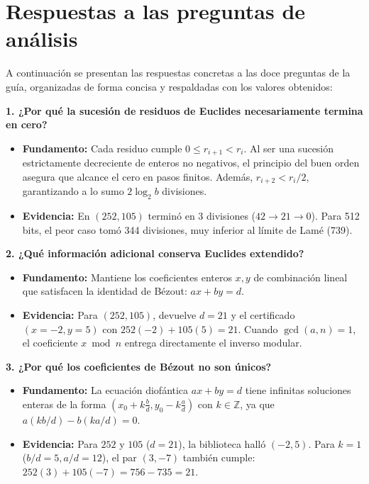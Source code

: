 \section{Respuestas a las preguntas de análisis}

A continuación se presentan las respuestas concretas a las doce preguntas de la guía, organizadas de forma concisa y respaldadas con los valores obtenidos:

\smallskip
\noindent\textbf{1. ¿Por qué la sucesión de residuos de Euclides necesariamente termina en cero?}
\begin{itemize}\setlength\itemsep{0pt}\setlength\parskip{0pt}
    \item \textbf{Fundamento:} Cada residuo cumple $0 \le r_{i+1} < r_i$. Al ser una sucesión estrictamente decreciente de enteros no negativos, el principio del buen orden asegura que alcance el cero en pasos finitos. Además, $r_{i+2} < r_i / 2$, garantizando a lo sumo $2 \log_2 b$ divisiones.
    \item \textbf{Evidencia:} En $(252, 105)$ terminó en 3 divisiones ($42 \to 21 \to 0$). Para 512 bits, el peor caso tomó 344 divisiones, muy inferior al límite de Lamé (739).
\end{itemize}

\smallskip
\noindent\textbf{2. ¿Qué información adicional conserva Euclides extendido?}
\begin{itemize}\setlength\itemsep{0pt}\setlength\parskip{0pt}
    \item \textbf{Fundamento:} Mantiene los coeficientes enteros $x, y$ de combinación lineal que satisfacen la identidad de Bézout: $ax + by = d$.
    \item \textbf{Evidencia:} Para $(252, 105)$, devuelve $d = 21$ y el certificado $(x = -2, y = 5)$ con $252(-2) + 105(5) = 21$. Cuando $\gcd(a, n) = 1$, el coeficiente $x \bmod n$ entrega directamente el inverso modular.
\end{itemize}

\smallskip
\noindent\textbf{3. ¿Por qué los coeficientes de Bézout no son únicos?}
\begin{itemize}\setlength\itemsep{0pt}\setlength\parskip{0pt}
    \item \textbf{Fundamento:} La ecuación diofántica $ax + by = d$ tiene infinitas soluciones enteras de la forma $(x_0 + k \frac{b}{d}, y_0 - k \frac{a}{d})$ con $k \in \mathbb{Z}$, ya que $a(kb/d) - b(ka/d) = 0$.
    \item \textbf{Evidencia:} Para $252$ y $105$ ($d = 21$), la biblioteca halló $(-2, 5)$. Para $k = 1$ ($b/d = 5, a/d = 12$), el par $(3, -7)$ también cumple: $252(3) + 105(-7) = 756 - 735 = 21$.
\end{itemize}

